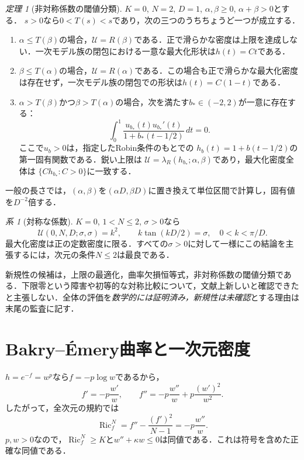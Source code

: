 \documentclass[12pt]{amsart}
\theoremstyle{definition}
\theoremstyle{remark}
\numberwithin{equation}{section}
\DeclareMathOperator{\Ric}{Ric}
\newtheorem{jthm}[thm]{定理}
\newtheorem{jcor}[thm]{系}
\begin{document}
\begin{jthm}[非対称係数の閾値分類]\label{ja:phase}
$K=0$, $N=2$, $D=1$, $\alpha,\beta\ge0$, $\alpha+\beta>0$とする．
$s>0$なら$0<T(s)<s$であり，次の三つのうちちょうど一つが成立する．
\begin{enumerate}
\item $\alpha\le T(\beta)$の場合，$\mathcal U=R(\beta)$である．正で滑らかな密度は上限を達成しない．一次モデル族の閉包における一意な最大化形状は$h(t)=Ct$である．
\item $\beta\le T(\alpha)$の場合，$\mathcal U=R(\alpha)$である．この場合も正で滑らかな最大化密度は存在せず，一次モデル族の閉包での形状は$h(t)=C(1-t)$である．
\item $\alpha>T(\beta)$かつ$\beta>T(\alpha)$の場合，次を満たす$b_*\in(-2,2)$が一意に存在する：
\begin{equation}\label{ja:stationarity}
 \int_0^1\frac{u_{b_*}(t)u_{b_*}'(t)}{1+b_*(t-1/2)}\,dt=0.
\end{equation}
ここで$u_b>0$は，指定したRobin条件のもとでの
$h_b(t)=1+b(t-1/2)$の第一固有関数である．鋭い上限は
$\mathcal U=\lambda_R(h_{b_*};\alpha,\beta)$であり，最大化密度全体は
$\{Ch_{b_*}:C>0\}$に一致する．
\end{enumerate}
一般の長さでは，$(\alpha,\beta)$を$(\alpha D,\beta D)$に置き換えて単位区間で計算し，固有値を$D^{-2}$倍する．
\end{jthm}

\begin{jcor}[対称な係数]\label{ja:symmetric}
$K=0$, $1<N\le2$, $\sigma>0$なら
\[
 \mathcal U(0,N,D;\sigma,\sigma)=k^2,
 \qquad k\tan(kD/2)=\sigma,\quad 0<k<\pi/D.
\]
最大化密度は正の定数密度に限る．すべての$\sigma>0$に対して一様にこの結論を主張するには，次元の条件$N\le2$は最良である．
\end{jcor}

新規性の候補は，上限の最適化，曲率欠損恒等式，非対称係数の閾値分類である．下限零という障害や初等的な対称比較について，文献上新しいと確認できたと主張しない．全体の評価を\emph{数学的には証明済み，新規性は未確認}とする理由は末尾の監査に記す．

\section{Bakry--\'Emery曲率と一次元密度}
$h=e^{-f}=w^p$なら$f=-p\log w$であるから，
\[
 f'=-p\frac{w'}w,\qquad
 f''=-p\frac{w''}w+p\frac{(w')^2}{w^2}.
\]
したがって，全次元の規約では
\begin{equation}\label{ja:ricci}
 \Ric_f^N=f''-\frac{(f')^2}{N-1}=-p\frac{w''}w.
\end{equation}
$p,w>0$なので，$\Ric_f^N\ge K$と$w''+\kappa w\le0$は同値である．これは符号を含めた正確な同値である．
\end{document}
